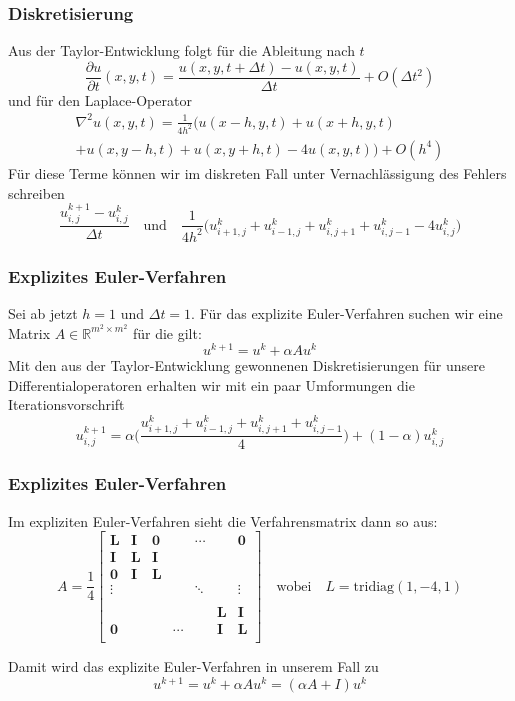 \documentclass[xcolor = dvipsnames, notheorems, 10pt]{beamer}
\theoremstyle{definition}
\begin{document}
\begin{frame}
\frametitle{Diskretisierung}
	Aus der Taylor-Entwicklung folgt für die Ableitung nach $t$
	$$\frac{\partial u}{\partial t}(x,y,t) = \frac{u(x,y,t+\Delta t) - u(x,y,t)}{\Delta t} + O(\Delta t^2)$$
	und für den Laplace-Operator
	\begin{multline*}
		\nabla^2u(x,y,t) = \frac{1}{4h^2} \bigg(u(x-h,y,t) + u(x+h,y,t) \\+ u(x,y-h,t) + u(x,y+h,t) - 4u(x,y,t) \bigg) + O(h^4)
	\end{multline*}
	Für diese Terme können wir im diskreten Fall unter Vernachlässigung des Fehlers schreiben
	$$ \frac{u_{i,j}^{k+1} - u_{i,j}^k}{\Delta t} \quad\text{und}\quad \frac{1}{4h^2} \bigg( u_{i+1,j}^k + u_{i-1,j}^k + u^k_{i,j+1} + u^k_{i,j-1} - 4u^k_{i,j} \bigg)$$
\end{frame}


\begin{frame}
\frametitle{Explizites Euler-Verfahren}
	Sei ab jetzt $h = 1$ und $\Delta t = 1$.
	Für das explizite Euler-Verfahren suchen wir eine Matrix $A \in \mathbb{R}^{m^2 \times m^2}$ für die gilt:
	$$u^{k+1} = u^k + \alpha A u^k$$
	Mit den aus der Taylor-Entwicklung gewonnenen Diskretisierungen für unsere Differentialoperatoren erhalten wir mit ein paar Umformungen die Iterationsvorschrift
	$$u^{k+1}_{i,j} = \alpha \bigg( \frac{u_{i+1,j}^k + u_{i-1,j}^k + u^k_{i,j+1} + u^k_{i,j-1}}{4} \bigg)
		+ (1-\alpha)u^k_{i,j} $$
\end{frame}

\begin{frame}
\frametitle{Explizites Euler-Verfahren}
	Im expliziten Euler-Verfahren sieht die Verfahrensmatrix dann so aus:
	$$ A = \frac{1}{4}
		\begin{bmatrix}
			\mathbf{L} 	& \mathbf{I} 	& \mathbf{0} 	& 				& \cdots 		&				& \mathbf{0} 	\\
			\mathbf{I}	& \mathbf{L} 	& \mathbf{I} 	& 				&				& 				&			 	\\
			\mathbf{0}	& \mathbf{I}	& \mathbf{L}	& 				& 				&				&				\\
			\vdots		&				&				& 				& \ddots		&				& \vdots		\\
						&				&				&				&				&				&				\\
						&				&				&				&				& \mathbf{L}	& \mathbf{I}	\\
			\mathbf{0}	&				&				&	\cdots		&				& \mathbf{I}	& \mathbf{L}	\\		
		\end{bmatrix}
	\quad
	\text{wobei}
	\quad
	L = \text{tridiag}(1,-4,1)$$
	
	Damit wird das explizite Euler-Verfahren in unserem Fall zu
	$$ u^{k+1} = u^k + \alpha A u^k = (\alpha A + I)u^k $$
\end{frame}
\end{document}
